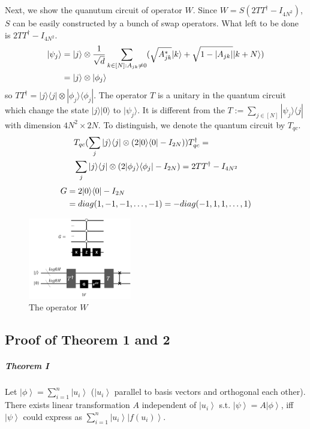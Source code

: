 \documentclass[%
 reprint,
 amsmath,amssymb,
pra,
]{revtex4-1}
\begin{document}
Next, we show the quanutum circuit of operator $W$. Since $W=S(2TT^\dagger-I_{4N^2})$, $S$ can be easily constructed by a bunch of swap operators.
What left to be done is $2TT^\dagger-I_{4N^2}$. 
\begin{align}
|\psi_j\rangle&=|j\rangle\otimes\frac{1}{\sqrt{d}} 
\sum_{k\in [N]:A_{jk}\neq 0}(\sqrt{A^*_{jk}}|k\rangle+\sqrt{1-|A_{jk}|}|k+N
\rangle)\notag\\
&=|j\rangle\otimes|\phi_j\rangle\notag
\end{align}
so $TT^\dagger=|j\rangle\langle j|\otimes|\phi_j\rangle\langle\phi_j|$.
The operator $T$ is a unitary in the quantum circuit which change
the state $|j\rangle|0\rangle$ to $|\psi_j\rangle$. It is different from the
$T:=\sum_{j\in[N]}|\psi_j\rangle\langle j|$ with dimension $4N^2\times2N$.
To distinguish, we denote the quantum circuit by $T_{qc}$.
\begin{align}
&T_{qc}(\sum_j|j\rangle\langle j|\otimes(2|0\rangle\langle0|-I_{2N}))
T_{qc}^\dagger=\notag\\
&\sum_j|j\rangle\langle j|\otimes
(2|\phi_j\rangle\langle \phi_j|-I_{2N})=2TT^\dagger-I_{4N^2}\notag
\end{align}
\begin{align}
G&=2|0\rangle\langle0|-I_{2N}\notag \\
&=diag(1,-1,-1,\dots,-1)=-diag(-1,1,1,\dots,1)\notag
\end{align}
\begin{figure}[htbp]
\centering
\includegraphics[width=0.4\textwidth]{Fig/WW}
\caption{The operator $W$}
\label{W}
\end{figure}

\subsection{Proof of Theorem 1 and 2}\label{ProofOfTheorem}
\subparagraph{Theorem I} Let $\left|\phi\right\rangle = \sum_{i=1}^n \left|u_i\right\rangle$ ($\left|u_i\right\rangle$ parallel to basis vectors and orthogonal each other). There exists 
linear transformation $A$ independent of $\left|u_{i}\right\rangle$ s.t. $\left|\psi\right\rangle = A\left|\phi\right\rangle$, iff $\left|\psi\right\rangle$ could express as $\sum_{i=1}^{n}\left|u_i\right\rangle\left|f\left(u_i\right)\right\rangle$.
\end{document}
